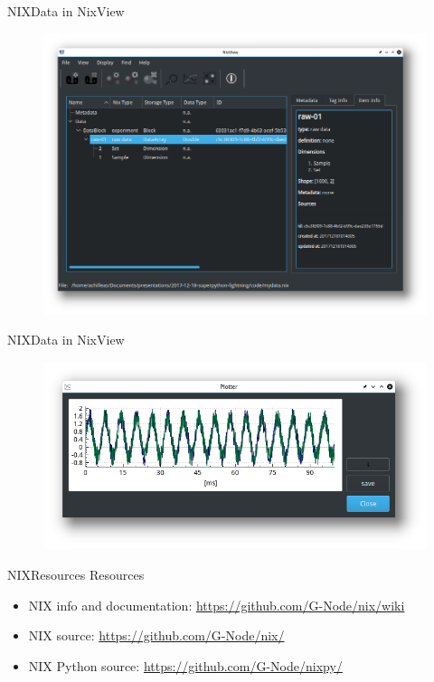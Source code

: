 \documentclass[10pt]{beamer}
\begin{document}
\begin{frame}{NIX}{Data in NixView}
    \begin{figure}
        \includegraphics[width=\textwidth]{nixview-data.png}
    \end{figure}
\end{frame}

\begin{frame}{NIX}{Data in NixView}
    \begin{figure}
        \includegraphics[width=\textwidth]{nixview-plot.png}
    \end{figure}
\end{frame}

\begin{frame}{NIX}{Resources}
    Resources

    \begin{itemize}
        \item NIX info and documentation: \url{https://github.com/G-Node/nix/wiki}
        \item NIX source: \url{https://github.com/G-Node/nix/}
        \item NIX Python source: \url{https://github.com/G-Node/nixpy/}
    \end{itemize}
\end{frame}
\end{document}
